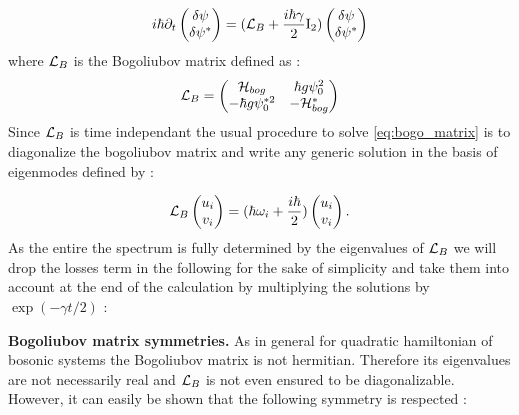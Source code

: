 \begin{equation}
    \begin{matrix}i\hbar \partial_t
        \begin{pmatrix}
             \delta\psi \\
             \delta\psi^*
        \end{pmatrix}
        = (\mathcal{L}_B  +\dfrac{i\hbar\gamma}{2}\mathrm{I_2})
        \begin{pmatrix}
             \delta\psi \\
             \delta\psi^*
        \end{pmatrix}
    \end{matrix}
    \label{eq:bogo_matrix}
\end{equation}
where $\mathcal{L}_B$ is the Bogoliubov matrix defined as :
\begin{equation}
    \begin{matrix}
    \mathcal{L}_B =
    \begin{pmatrix}
        \mathcal{H}_{bog} &  \hbar g \psi_0^2\\
        -\hbar g \psi_0^{*2} & -\mathcal{H}_{bog}^*
    \end{pmatrix}
\end{matrix}
\end{equation} 
Since $\mathcal{L}_B$ is time independant the usual procedure to solve \autoref{eq:bogo_matrix} is to diagonalize the bogoliubov matrix and write any generic solution 
in the basis of eigenmodes defined by :

\begin{equation}
    \mathcal{L}_B \begin{pmatrix}
        u_{i} \\
        v_{i}
    \end{pmatrix} = (\hbar\omega_i+\dfrac{i\hbar}{2}) \begin{pmatrix}
        u_{i} \\
        v_{i}
    \end{pmatrix}.
\end{equation}
As the entire the spectrum is fully determined by the eigenvalues of $\mathcal{L}_B$ we will drop the losses term in the following for the sake of simplicity and 
take them into account at the end of the calculation by multiplying the solutions by $\exp(-\gamma t/2)$ :

\bigskip

\textbf{Bogoliubov matrix symmetries.} As in general for quadratic hamiltonian of bosonic systems \cite{castin_bose-einstein_2001} the Bogoliubov matrix is not hermitian. Therefore its eigenvalues are not 
necessarily real and $\mathcal{L}_B$ is not even ensured to be diagonalizable. However, it can easily be shown that the following symmetry is respected :

